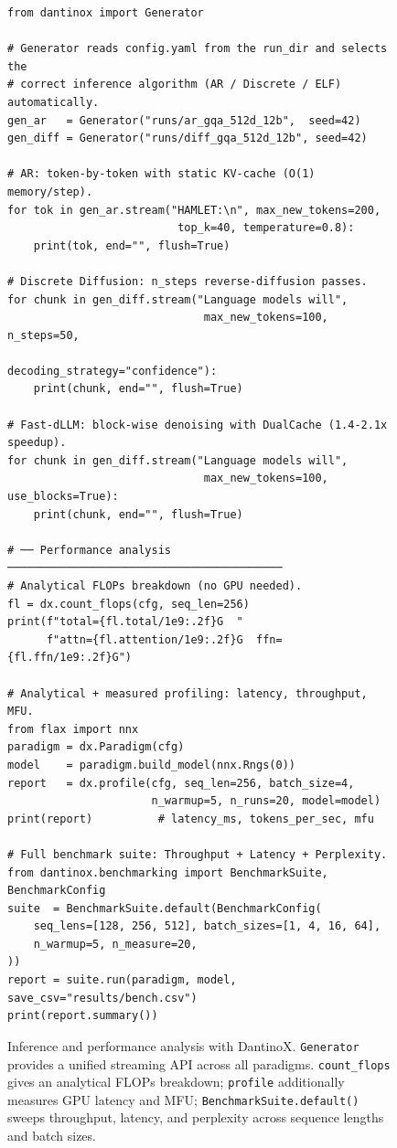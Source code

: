 \begin{figure}[t]
\begin{lstlisting}[style=dxpy]
from dantinox import Generator

# Generator reads config.yaml from the run_dir and selects the
# correct inference algorithm (AR / Discrete / ELF) automatically.
gen_ar   = Generator("runs/ar_gqa_512d_12b",  seed=42)
gen_diff = Generator("runs/diff_gqa_512d_12b", seed=42)

# AR: token-by-token with static KV-cache (O(1) memory/step).
for tok in gen_ar.stream("HAMLET:\n", max_new_tokens=200,
                          top_k=40, temperature=0.8):
    print(tok, end="", flush=True)

# Discrete Diffusion: n_steps reverse-diffusion passes.
for chunk in gen_diff.stream("Language models will",
                              max_new_tokens=100, n_steps=50,
                              decoding_strategy="confidence"):
    print(chunk, end="", flush=True)

# Fast-dLLM: block-wise denoising with DualCache (1.4-2.1x speedup).
for chunk in gen_diff.stream("Language models will",
                              max_new_tokens=100, use_blocks=True):
    print(chunk, end="", flush=True)

# ── Performance analysis ──────────────────────────────────────────
# Analytical FLOPs breakdown (no GPU needed).
fl = dx.count_flops(cfg, seq_len=256)
print(f"total={fl.total/1e9:.2f}G  "
      f"attn={fl.attention/1e9:.2f}G  ffn={fl.ffn/1e9:.2f}G")

# Analytical + measured profiling: latency, throughput, MFU.
from flax import nnx
paradigm = dx.Paradigm(cfg)
model    = paradigm.build_model(nnx.Rngs(0))
report   = dx.profile(cfg, seq_len=256, batch_size=4,
                      n_warmup=5, n_runs=20, model=model)
print(report)          # latency_ms, tokens_per_sec, mfu

# Full benchmark suite: Throughput + Latency + Perplexity.
from dantinox.benchmarking import BenchmarkSuite, BenchmarkConfig
suite  = BenchmarkSuite.default(BenchmarkConfig(
    seq_lens=[128, 256, 512], batch_sizes=[1, 4, 16, 64],
    n_warmup=5, n_measure=20,
))
report = suite.run(paradigm, model, save_csv="results/bench.csv")
print(report.summary())
\end{lstlisting}
\caption{Inference and performance analysis with DantinoX. \texttt{Generator}
  provides a unified streaming API across all paradigms. \texttt{count\_flops}
  gives an analytical FLOPs breakdown; \texttt{profile} additionally measures
  GPU latency and MFU; \texttt{BenchmarkSuite.default()} sweeps throughput,
  latency, and perplexity across sequence lengths and batch sizes.}
\label{lst:inference}
\end{figure}

